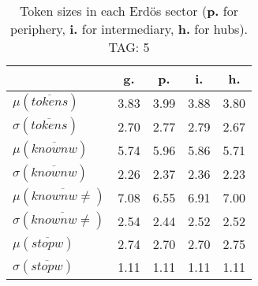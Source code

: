 \begin{table}[h!]
\begin{center}
\begin{tabular}{| l | c | c | c | c |}\hline
 & g. & p. & i. & h. \\\hline
$\mu(\overline{tokens})$ & 3.83  & 3.99  & 3.88  & 3.80 \\\hline
$\sigma(\overline{tokens})$ & 2.70  & 2.77  & 2.79  & 2.67 \\\hline
$\mu(\overline{knownw})$ & 5.74  & 5.96  & 5.86  & 5.71 \\\hline
$\sigma(\overline{knownw})$ & 2.26  & 2.37  & 2.36  & 2.23 \\\hline
$\mu(\overline{knownw \neq})$ & 7.08  & 6.55  & 6.91  & 7.00 \\\hline
$\sigma(\overline{knownw \neq})$ & 2.54  & 2.44  & 2.52  & 2.52 \\\hline
$\mu(\overline{stopw})$ & 2.74  & 2.70  & 2.70  & 2.75 \\\hline
$\sigma(\overline{stopw})$ & 1.11  & 1.11  & 1.11  & 1.11 \\\hline
\end{tabular}
\caption{Token sizes in each Erd\"os sector ({{\bf p.}} for periphery, {{\bf i.}} for intermediary, {{\bf h.}} for hubs). TAG: 5}
\end{center}
\end{table}